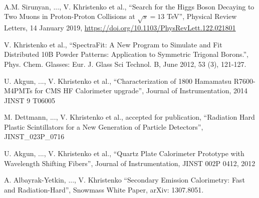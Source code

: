 \documentclass[10pt, letterpaper]{deps1}
\begin{document}
\\
\\
\\
\vspace{5pt}

\small{\begin{tightitemize}
    \item A.M. Sirunyan, ..., V. Khristenko et al., ``Search for the Higgs Boson Decaying to Two Muons in Proton-Proton Collisions at $\sqrt{s}=13$ TeV'', Physical Review Letters, 14 January 2019, \url{https://doi.org/10.1103/PhysRevLett.122.021801}
    \item V. Khristenko et al., ``SpectraFit: A New Program to Simulate and Fit Distributed 10B Powder Patterns: Application to Symmetric Trigonal Borons.'', Phys. Chem. Glasses: Eur. J. Glass Sci Technol. B, June 2012, 53 (3), 121-127.
    \item U. Akgun, ..., V. Khristenko et al., ``Characterization of 1800 Hamamatsu R7600-M4PMTs for CMS HF Calorimeter upgrade'', Journal of Instrumentation, 2014 JINST 9 T06005
    \item M. Dettmann, ..., V. Khristenko et al., accepted for publication, ``Radiation Hard Plastic Scintillators for a New Generation of Particle Detectors'', JINST\_023P\_0716
    \item U. Akgun, ..., V. Khristenko et al., ``Quartz Plate Calorimeter Prototype with Wavelength Shifting Fibers'', Journal of Instrumentation, JINST 002P 0412, 2012
    \item A. Albayrak-Yetkin, ..., V. Khristenko ``Secondary Emission Calorimetry: Fast and Radiation-Hard'', Snowmass White Paper, arXiv: 1307.8051.
\end{tightitemize}}
\end{document}
